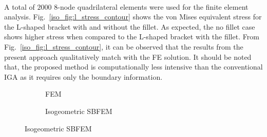 \paragraph{}
A total of $2000$ $8$-node quadrilateral elements were used for the finite element analysis.
Fig.~\ref{iso_fig:l_stress_contour} shows the von Mises equivalent stress for the L-shaped bracket with and without the fillet.
As expected, the no fillet case shows higher stress when compared to the L-shaped bracket with the fillet.
From Fig.~\ref{iso_fig:l_stress_contour}, it can be observed that the results from the present approach qualitatively match with the FE solution.
It should be noted that, the proposed method is computationally less intensive than the conventional IGA as it requires
    only the boundary information.
    \begin{figure}[h!]
        \begin{subfigure}[b]{0.5\linewidth}
            \centering
            \caption{FEM}
        \end{subfigure}
        \begin{subfigure}[b]{0.5\linewidth}
            \centering
            \caption{Isogeometric SBFEM}
        \end{subfigure}


\end{figure}
